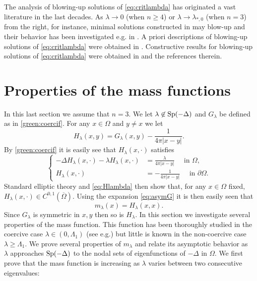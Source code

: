 \documentclass[10pt]{amsart}
\numberwithin{equation}{section}
\newcommand{\Sp}{{\rm Sp}}
\newcommand{\Om}{\Omega}
\theoremstyle{plain}
\theoremstyle{remark}
\begin{document}
The analysis of blowing-up solutions of \eqref{eq:critlambda} has originated a vast literature in the last decades. As $\lambda \to 0$ (when $n \ge 4$) or $\lambda \to \lambda_{*,0}$ (when $n=3$) from the right, for instance, minimal solutions constructed in \cite{BN, Druetdim3} may blow-up and their behavior has been investigated e.g. in \cite{Druetdim3, HanBN, Rey}. A priori descriptions of blowing-up solutions of \eqref{eq:critlambda} were obtained in  \cite{AGGP, BAEMP1, BAEMP2, FrankKonigKovarik3, HebeyBN, IacopettiPacella, IacopettiVaira2, LaurainKonig1, LaurainKonig2, Rey}. Constructive results for blowing-up solutions of \eqref{eq:critlambda} were obtained in \cite{LiVairaWeiWu, MussoPistoia2, MussoSalazar, PistoiaRagoVaira, PistoiaRocci, PistoiaVaira2, Premoselli12, SunWeiYang, SunWeiYang2} and the references therein.




\section{Properties of the mass functions} \label{annexe:masse}


In this last section we assume that $n=3$. We let $\lambda \not \in \Sp(- \Delta)$ and $G_\lambda$ be defined as in  \eqref{green:coercif}. For any $x \in \Om$ and $y \neq x$ we let
$$ H_\lambda(x,y) = G_\lambda(x,y) - \frac{1}{4\pi |x-y|}. $$
By  \eqref{green:coercif} it is easily see that $H_\lambda(x,\cdot)$ satisfies 
\begin{equation} \label{eq:Hlambda}
\left \{ \begin{aligned}
- \Delta H_\lambda(x, \cdot) - \lambda H_\lambda(x, \cdot) &=  \frac{\lambda}{4\pi |x-y|} \quad \text{ in } \Om, \\
  H_\lambda(x, \cdot) & = - \frac{1}{4\pi |x-y|} \quad \text{ in } \partial \Om.
\end{aligned} \right. 
\end{equation}
Standard elliptic theory and \eqref{eq:Hlambda} then show that, for any $x \in \Om$ fixed, $H_\lambda(x, \cdot) \in C^{0,1}(\overline{\Om})$. Using the expansion \eqref{eq:asymG} it is then easily seen that 
$$ m_\lambda(x) = H_\lambda(x,x). $$
Since $G_\lambda$ is symmetric in $x,y$ then so is $H_\lambda$. In this section we investigate several properties of the mass function. This function has been thoroughly studied in the coercive case $\lambda \in (0, \Lambda_1)$ (see e.g.\cite{DelPinoDolbeaultMusso}) but little is known in the non-coercive case $\lambda \ge \Lambda_1$. We prove several properties of $m_\lambda$ and relate its asymptotic behavior as $\lambda$ approaches $\Sp(-\Delta)$ to the nodal sets of eigenfunctions of $- \Delta$ in $\Om$. We first prove that the mass function is increasing as $\lambda$ varies between two consecutive eigenvalues: 
\end{document}
